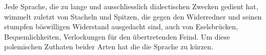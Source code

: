 Jede Sprache, die zu lange und ausschliesslich dialectischen Zwecken gedient hat, wimmelt zuletzt von Stacheln und Spitzen, die gegen den Widerredner und seinen stumpfen böswilligen Widerstand ausgedacht sind, auch von Eselsbrücken, Bequemlichkeiten, Verlockungen für den übertretenden Feind. Um diese polemischen Zuthaten beider Arten hat die  die Sprache zu kürzen.
\par

